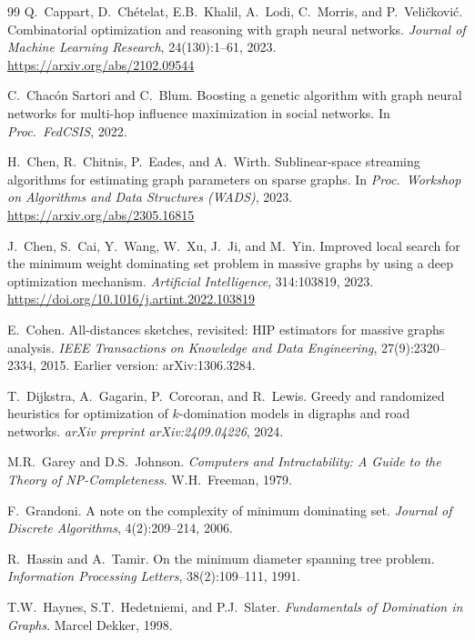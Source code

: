 \documentclass[11pt,a4paper]{article}
\begin{document}
\begin{thebibliography}{99}
Q.~Cappart, D.~Ch{\'e}telat, E.B.~Khalil, A.~Lodi, C.~Morris, and
  P.~Veli{\v c}kovi{\'c}.
\newblock Combinatorial optimization and reasoning with graph neural
  networks.
\newblock \emph{Journal of Machine Learning Research}, 24(130):1--61,
  2023.
\newblock \url{https://arxiv.org/abs/2102.09544}

C.~Chac{\'o}n Sartori and C.~Blum.
\newblock Boosting a genetic algorithm with graph neural networks for
  multi-hop influence maximization in social networks.
\newblock In \emph{Proc.\ FedCSIS}, 2022.

H.~Chen, R.~Chitnis, P.~Eades, and A.~Wirth.
\newblock Sublinear-space streaming algorithms for estimating graph
  parameters on sparse graphs.
\newblock In \emph{Proc.\ Workshop on Algorithms and Data Structures
  (WADS)}, 2023.
\newblock \url{https://arxiv.org/abs/2305.16815}

J.~Chen, S.~Cai, Y.~Wang, W.~Xu, J.~Ji, and M.~Yin.
\newblock Improved local search for the minimum weight dominating set
  problem in massive graphs by using a deep optimization mechanism.
\newblock \emph{Artificial Intelligence}, 314:103819, 2023.
\newblock \url{https://doi.org/10.1016/j.artint.2022.103819}

E.~Cohen.
\newblock All-distances sketches, revisited: HIP estimators for massive
  graphs analysis.
\newblock \emph{IEEE Transactions on Knowledge and Data Engineering},
  27(9):2320--2334, 2015.
\newblock Earlier version: arXiv:1306.3284.

T.~Dijkstra, A.~Gagarin, P.~Corcoran, and R.~Lewis.
\newblock Greedy and randomized heuristics for optimization of
  $k$-domination models in digraphs and road networks.
\newblock \emph{arXiv preprint arXiv:2409.04226}, 2024.

M.R.~Garey and D.S.~Johnson.
\newblock \emph{Computers and Intractability: A Guide to the Theory of
  NP-Completeness}.
\newblock W.H.~Freeman, 1979.

F.~Grandoni.
\newblock A note on the complexity of minimum dominating set.
\newblock \emph{Journal of Discrete Algorithms}, 4(2):209--214, 2006.

R.~Hassin and A.~Tamir.
\newblock On the minimum diameter spanning tree problem.
\newblock \emph{Information Processing Letters}, 38(2):109--111, 1991.

T.W.~Haynes, S.T.~Hedetniemi, and P.J.~Slater.
\newblock \emph{Fundamentals of Domination in Graphs}.
\newblock Marcel Dekker, 1998.


\end{thebibliography}
\end{document}
